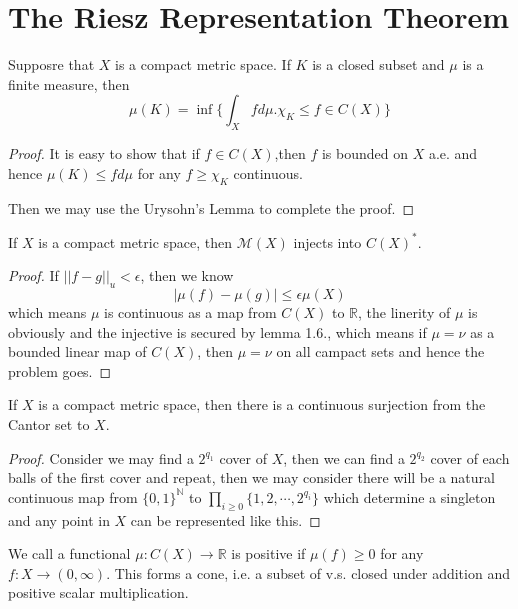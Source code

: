 \documentclass[lang=en, color=blue, ]{elegantbook}
\newcommand{\R}{\mathbb{R}}
\newcommand{\N}{\mathbb{N}}
\newcommand{\M}{\mathcal{M}}
\begin{document}
\section*{The Riesz Representation Theorem}

\begin{lemma}
    Supposre that $X$ is a compact metric space. If $K$ is a closed subset and $\mu$ is a finite measure, then
    \[\mu(K)= \inf\{\int_X fd\mu. \chi_K\leq f \in C(X)\}\]
\end{lemma}
\begin{proof}\par
    It is easy to show that if $f\in C(X)$,then $f$ is bounded on $X$ a.e. and hence $\mu(K) \leq fd\mu$ for any $f\geq\chi_K$ continuous.\par
    Then we may use the Urysohn's Lemma to complete the proof.\par
\end{proof}

\begin{lemma}
    If $X$ is a compact metric space, then $\M(X)$ injects into $C(X)^*$.    
\end{lemma}
\begin{proof}\par
    If $||f-g||_u < \epsilon$, then we know
    \[|\mu(f) - \mu(g)| \leq \epsilon\mu(X)\]
    which means $\mu$ is continuous as a map from $C(X)$ to $\R$, the linerity of $\mu$ is obviously and the injective is secured by lemma 1.6., which means if $\mu = \nu$ as a bounded linear map of $C(X)$, then $\mu = \nu$  on all campact sets and hence the problem goes.
\end{proof}

\begin{lemma}
    If $X$ is a compact metric space, then there is a continuous surjection from the Cantor set to $X$.
\end{lemma}
\begin{proof}\par
    Consider we may find a $2^{q_1}$ cover of $X$, then we can find a $2^{q_2}$ cover of each balls of the first cover and repeat, then we may consider there will be a natural continuous map from $\{0,1\}^{\N}$ to $\prod_{i\geq 0}\{1,2,\cdots,2^{q_i}\}$ which determine a singleton and any point in $X$ can be represented like this.
\end{proof}


\begin{definition}
    We call a functional $\mu: C(X)\to\R$ is positive if $\mu(f)\geq 0$ for any $f:X\to(0,\infty)$. This forms a cone, i.e. a subset of v.s. closed under addition and positive scalar multiplication.
\end{definition}
\end{document}
